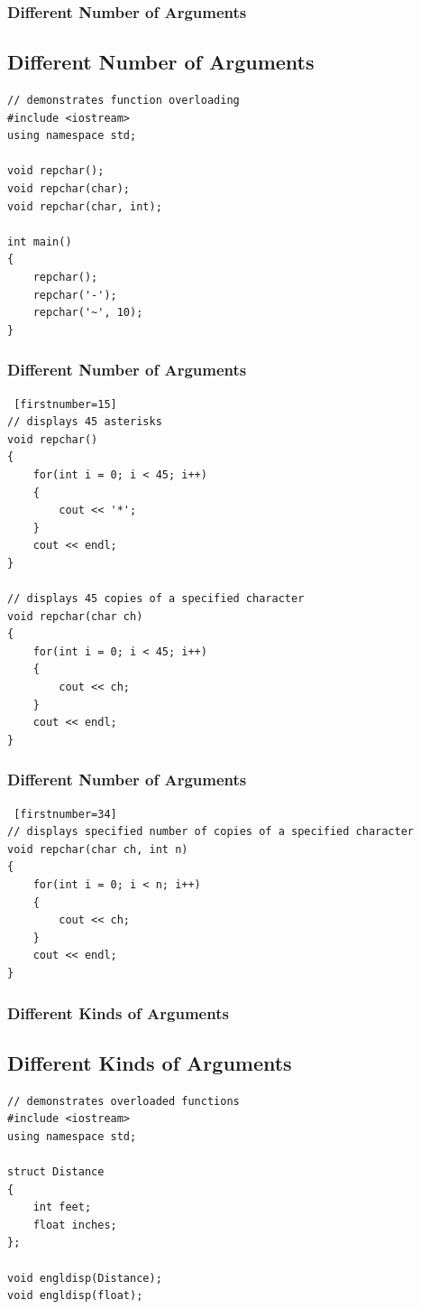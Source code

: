 \documentclass{beamer}
\begin{document}
\begin{frame}[fragile]\frametitle{Different Number of Arguments}
    \subsection{Different Number of Arguments} %
    \label{sub:different_number_of_arguments}
    \lstset{style=mystyle}
\begin{lstlisting}
// demonstrates function overloading
#include <iostream>
using namespace std;

void repchar();
void repchar(char);
void repchar(char, int);

int main()
{
    repchar();
    repchar('-');
    repchar('~', 10);
}
\end{lstlisting}
\end{frame}

\begin{frame}[fragile]\frametitle{Different Number of Arguments}
    \lstset{style=mystyle}
\begin{lstlisting} [firstnumber=15]
// displays 45 asterisks
void repchar()
{
    for(int i = 0; i < 45; i++)
    {
        cout << '*';
    }
    cout << endl;
}

// displays 45 copies of a specified character
void repchar(char ch)
{
    for(int i = 0; i < 45; i++)
    {
        cout << ch;
    }
    cout << endl;
}
\end{lstlisting}
\end{frame}

\begin{frame}[fragile]\frametitle{Different Number of Arguments}
    \lstset{style=mystyle}
\begin{lstlisting} [firstnumber=34]
// displays specified number of copies of a specified character
void repchar(char ch, int n)
{
    for(int i = 0; i < n; i++)
    {
        cout << ch;
    }
    cout << endl;
}
\end{lstlisting}
\end{frame}

\begin{frame}[fragile]\frametitle{Different Kinds of Arguments}
    \subsection{Different Kinds of Arguments} %
    \label{sub:different_kinds_of_arguments}
    \lstset{style=mystyle}
\begin{lstlisting}
// demonstrates overloaded functions
#include <iostream>
using namespace std;

struct Distance
{
    int feet;
    float inches;
};

void engldisp(Distance);
void engldisp(float);
\end{lstlisting}
\end{frame}
\end{document}
